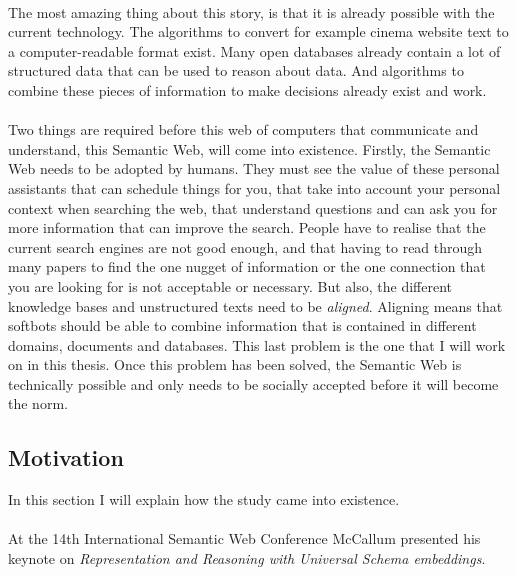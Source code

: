 \documentclass{article}
\begin{document}
 \paragraph{}
 The most amazing thing about this story, is that it is already possible with the current technology. The algorithms to convert for example cinema website text to a computer-readable format exist. Many open databases already contain a lot of structured data that can be used to reason about data. And algorithms to combine these pieces of information to make decisions already exist and work.
 \paragraph{}
 Two things are required before this web of computers that communicate and understand, this Semantic Web, will come into existence.
 Firstly, the Semantic Web needs to be adopted by humans. They must see the value of these personal assistants that can schedule things for you, that take into account your personal context when searching the web, that understand questions and can ask you for more information that can improve the search. People have to realise that the current search engines are not good enough, and that having to read through many papers to find the one nugget of information or the one connection that you are looking for is not acceptable or necessary.
 But also, the different knowledge bases and unstructured texts need to be \emph{aligned}. Aligning means that softbots should be able to combine information that is contained in different domains, documents and databases. This last problem is the one that I will work on in this thesis. Once this problem has been solved, the Semantic Web is technically possible and only needs to be socially accepted before it will become the norm\cite{microformats}.
 \subsection{Motivation}
 In this section I will explain how the study came into existence.
 \paragraph{}
 At the 14th International Semantic Web Conference McCallum presented his keynote on \emph{Representation and Reasoning with Universal Schema embeddings}\cite{mccallumweblecture}. 
 
\end{document}
